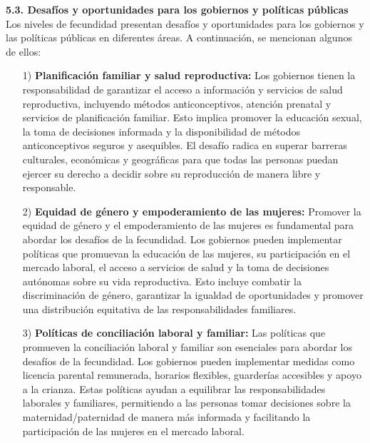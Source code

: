 \documentclass[8pt,a4paper]{beamer}
\begin{document}
{\begin{frame}{}
\begin{block}{\textbf{5.3. Desafíos y oportunidades para los gobiernos y políticas públicas}}
\setlength{\parskip}{3px}
\justifying
Los niveles de fecundidad presentan desafíos y oportunidades para los gobiernos y las políticas públicas en diferentes áreas. A continuación, se mencionan algunos de ellos:
\begin{enumerate}
\setlength{\parskip}{3px}
\justifying
\item[1)] \textbf{Planificación familiar y salud reproductiva:} Los gobiernos tienen la responsabilidad de garantizar el acceso a información y servicios de salud reproductiva, incluyendo métodos anticonceptivos, atención prenatal y servicios de planificación familiar. Esto implica promover la educación sexual, la toma de decisiones informada y la disponibilidad de métodos anticonceptivos seguros y asequibles. El desafío radica en superar barreras culturales, económicas y geográficas para que todas las personas puedan ejercer su derecho a decidir sobre su reproducción de manera libre y responsable.

\item[2)] \textbf{Equidad de género y empoderamiento de las mujeres:} Promover la equidad de género y el empoderamiento de las mujeres es fundamental para abordar los desafíos de la fecundidad. Los gobiernos pueden implementar políticas que promuevan la educación de las mujeres, su participación en el mercado laboral, el acceso a servicios de salud y la toma de decisiones autónomas sobre su vida reproductiva. Esto incluye combatir la discriminación de género, garantizar la igualdad de oportunidades y promover una distribución equitativa de las responsabilidades familiares.
\end{enumerate}
\end{block}
\end{frame}


\begin{frame}{}
\begin{block}{}
\setlength{\parskip}{3px}
\justifying
\begin{enumerate}
\setlength{\parskip}{3px}
\justifying
\item[3)] \textbf{Políticas de conciliación laboral y familiar:} Las políticas que promueven la conciliación laboral y familiar son esenciales para abordar los desafíos de la fecundidad. Los gobiernos pueden implementar medidas como licencia parental remunerada, horarios flexibles, guarderías accesibles y apoyo a la crianza. Estas políticas ayudan a equilibrar las responsabilidades laborales y familiares, permitiendo a las personas tomar decisiones sobre la maternidad/paternidad de manera más informada y facilitando la participación de las mujeres en el mercado laboral.


\end{enumerate}
\end{block}
\end{frame}}
\end{document}
